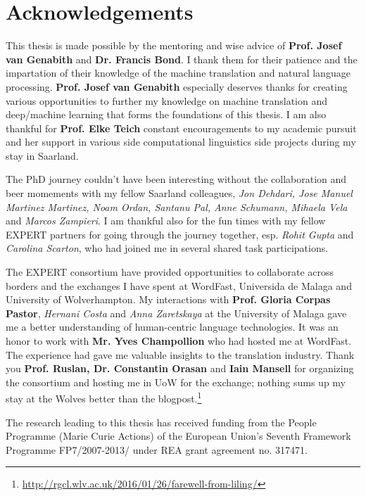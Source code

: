 \chapter*{\vspace{-30mm}Acknowledgements}

This thesis is made possible by the mentoring and wise advice of \textbf{Prof. Josef van Genabith} and \textbf{Dr. Francis Bond}. I thank them for their patience and the impartation of their knowledge of the machine translation and natural language processing. \textbf{Prof. Josef van Genabith} especially deserves thanks for creating various opportunities to further my knowledge on machine translation and deep/machine learning that forms the foundations of this thesis. I am also thankful for \textbf{Prof. Elke Teich} constant encouragements to my academic pursuit and her support in various side computational linguistics side projects during my stay in Saarland. 

The PhD journey couldn't have been interesting without the collaboration and beer momements with my fellow Saarland colleagues, \textit{Jon Dehdari, Jose Manuel Martinez Martinez, Noam Ordan, Santanu Pal, Anne Schumann, Mihaela Vela} and \textit{Marcos Zampieri}. I am thankful also for the fun times with my fellow EXPERT partners for going through the journey together, esp. \textit{Rohit Gupta} and \textit{Carolina Scarton}, who had joined me in several shared task participations. 

The EXPERT consortium have provided opportunities to collaborate across borders and the exchanges I have spent at WordFast, Universida de Malaga and University of Wolverhampton. My interactions with \textbf{Prof. Gloria Corpas Pastor}, \textit{Hernani Costa} and \textit{Anna Zaretskaya} at the University of Malaga gave me a better understanding of human-centric language technologies. It was an honor to work with \textbf{Mr. Yves Champollion }who had hosted me at WordFast. The experience had gave me valuable insights to the translation industry. Thank you \textbf{Prof. Ruslan, Dr. Constantin Orasan} and \textbf{Iain Mansell} for organizing the consortium and hosting me in UoW for the exchange; nothing sums up my stay at the Wolves better than the blogpost.\footnote{\url{http://rgcl.wlv.ac.uk/2016/01/26/farewell-from-liling/}}

The research leading to this thesis has received funding from the People Programme (Marie Curie Actions) of the European Union's Seventh Framework Programme FP7/2007-2013/ under REA grant agreement no. 317471.
